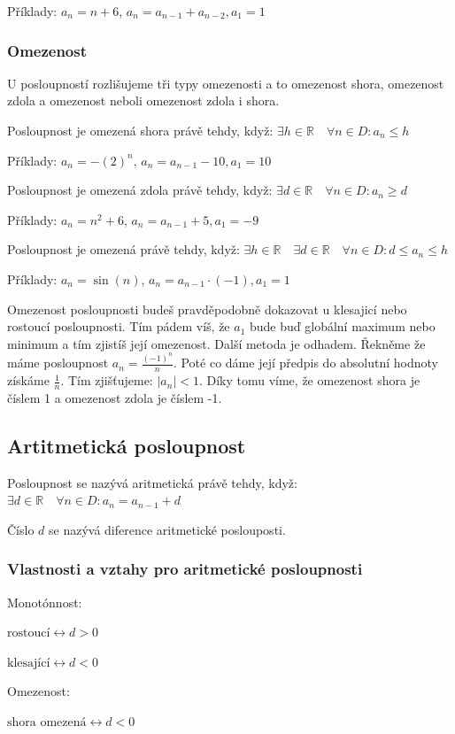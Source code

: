 \documentclass[12pt]{article}
\begin{document}
Příklady: $a_n = n+6$, $a_n = a_{n-1} + a_{n-2}, a_1 = 1$
\subsubsection*{Omezenost}
U posloupností rozlišujeme tři typy omezenosti a to omezenost shora, omezenost zdola a omezenost
neboli omezenost zdola i shora.

Posloupnost je omezená shora právě tehdy, když: $\exists h \in \mathbb{R} \quad \forall n \in D :
a_n \le h$

Příklady: $a_n = -(2)^n$, $a_n = a_{n-1} - 10, a_1 = 10$

Posloupnost je omezená zdola právě tehdy, když: $\exists d \in \mathbb{R} \quad \forall n \in D :
a_n \ge d$

Příklady: $a_n = n^2 + 6$, $a_n = a_{n-1} + 5, a_1 = -9$

Posloupnost je omezená právě tehdy, když: $\exists h \in \mathbb{R} \quad \exists d \in \mathbb{R}
\quad \forall n \in D : d \le a_n \le h$

Příklady: $a_n = \sin(n)$, $a_n = a_{n-1} \cdot (-1), a_1 = 1$

Omezenost posloupnosti budeš pravděpodobně dokazovat u klesajicí nebo rostoucí posloupnosti. Tím pádem
víš, že $a_1$ bude buď globální maximum nebo minimum a tím zjistíš její omezenost. Další metoda je
odhadem. Řekněme že máme posloupnost $a_n = \frac{(-1)^n}{n}$. Poté co dáme její předpis do
absolutní hodnoty získáme $\frac{1}{n}$. Tím zjišťujeme: $|a_n| < 1$. Díky tomu víme, že omezenost
shora je číslem 1 a omezenost zdola je číslem -1.
\subsection*{Artitmetická posloupnost}
Posloupnost se nazývá aritmetická právě tehdy, když: $\exists d \in \mathbb{R} \quad \forall n \in D
: a_n = a_{n-1} + d$

Číslo $d$ se nazývá diference aritmetické poslouposti.
\subsubsection*{Vlastnosti a vztahy pro aritmetické posloupnosti}
Monotónnost:

$\text{rostoucí} \leftrightarrow d > 0$

$\text{klesající} \leftrightarrow d < 0$

Omezenost:

$\text{shora omezená} \leftrightarrow d < 0$
\end{document}
